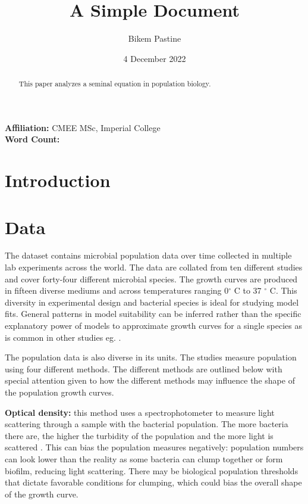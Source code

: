\documentclass[11pt]{article}
\title{A Simple Document}
\author{Bikem Pastine}
\date{4 December 2022}
\begin{document}
  \centering
  \maketitle
  
  \textbf{Affiliation:} CMEE MSc, Imperial College\\

  \textbf{Word Count:} 
  
   \newpage

  \begin{abstract}
    This paper analyzes a seminal equation in population biology.
  \end{abstract}

  \newpage

  \section{Introduction}
  \raggedright
  
  \section{Data}
  The dataset contains microbial population data over time collected in multiple lab experiments across the world.  The data are collated from ten different studies and cover forty-four different microbial species. The growth curves are produced in fifteen diverse mediums and across temperatures ranging 0$^{\circ}$ C to 37 $^{\circ}$ C. This diversity in experimental design and bacterial species is ideal for studying model fits. General patterns in model suitability can be inferred rather than the specific explanatory power of models to approximate growth curves for a single species as is common in other studies eg. \cite{Zwietering1990}.

  The population data is also diverse in its units. The studies measure population using four different methods. The different methods are outlined below with special attention given to how the different methods may influence the shape of the population growth curves.

  \textbf{Optical density:} this method uses a spectrophotometer to measure light scattering through a sample with the bacterial population. The more bacteria there are, the higher the turbidity of the population and the more light is scattered \cite{Madigan_Michael2021-07-01}. This can bias the population measures negatively: population numbers can look lower than the reality as some bacteria can clump together or form biofilm, reducing light scattering. There may be biological population thresholds that dictate favorable conditions for clumping, which could bias the overall shape of the growth curve. 
\end{document}
